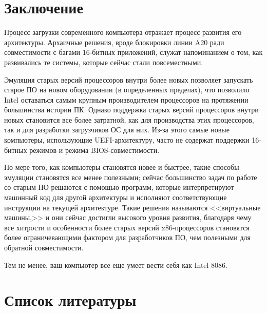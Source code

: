 \documentclass[a4page]{article}
\begin{document}
\section{Заключение}

Процесс загрузки современного компьютера отражает процесс развития его архитектуры.
Архаичные решения, вроде блокировки линии A20 ради совместимости с багами 16-битных приложений,
служат напоминанием о том, как развивались те системы, которые сейчас стали повсеместными.

Эмуляция старых версий процессоров внутри более новых позволяет запускать старое ПО на новом оборудовании (в определенных пределах),
что позволило Intel оставаться самым крупным производителем процессоров на протяжении большинства истории ПК.
Однако поддержка старых версий процессоров внутри новых становится все более затратной,
как для производства этих процессоров, так и для разработки загрузчиков ОС для них.
Из-за этого самые новые компьютеры, использующие UEFI-архитектуру, часто не содержат поддержки 16-битных режимов
и режима BIOS-совместимости.

По мере того, как компьютеры становятся новее и быстрее, такие способы эмуляции становятся все менее полезными;
сейчас большинство задач по работе со старым ПО решаются с помощью программ, которые интерпретируют машинный код
для другой архитектуры и исполняют соответствующие инструкции на текущей архитектуре.
Такие решения называются <<виртуальные машины,>> и они сейчас достигли высокого уровня развития,
благодаря чему все хитрости и особенности более старых версий x86-процессоров становятся более ограничевающими фактором
для разработчиков ПО, чем полезными для обратной совместимости.

Тем не менее, ваш компьютер все еще умеет вести себя как Intel 8086.

\newpage

\section{Список литературы}

\printbibliography [heading=none]
\end{document}
